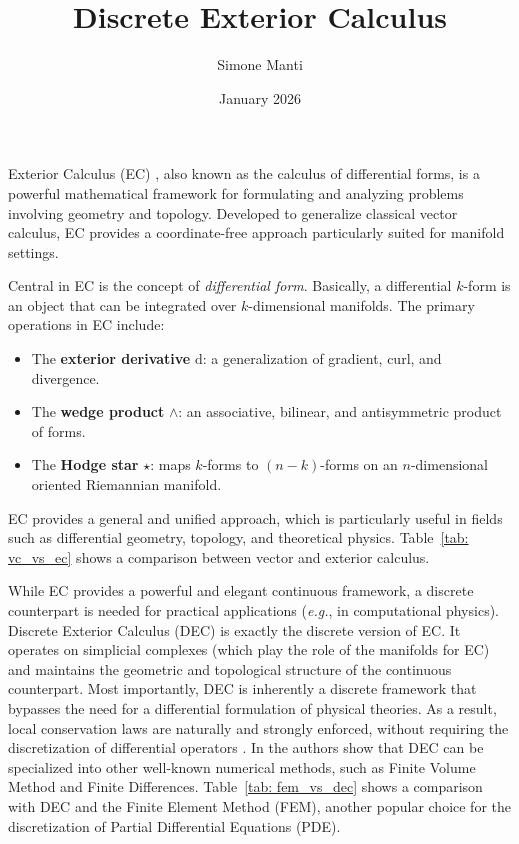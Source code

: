 \documentclass{article}
\title{Discrete Exterior Calculus}
\author{Simone Manti}
\date{January 2026}
\theoremstyle{definition} %
\theoremstyle{plain} %
\theoremstyle{remark} %
\begin{document}
\maketitle

Exterior Calculus (EC) \cite{abraham2012manifolds}, also known as the calculus of differential forms, is a powerful mathematical framework for formulating and analyzing problems involving geometry and topology. Developed to generalize classical vector calculus, EC provides a coordinate-free approach particularly suited for manifold settings.

Central in EC is the concept of \textit{differential form}. Basically, a differential $k$-form is an object that can be integrated over $k$-dimensional manifolds. The primary operations in EC include:
\begin{itemize}
\item The \textbf{exterior derivative} $\mathrm{d}$: a generalization of gradient, curl, and divergence.
\item The \textbf{wedge product} $\wedge$: an associative, bilinear, and antisymmetric product of forms.
\item The \textbf{Hodge star} $\star$: maps $k$-forms to $(n-k)$-forms on an $n$-dimensional oriented Riemannian manifold.
\end{itemize}
EC provides a general and unified approach, which is particularly useful in fields such as differential geometry, topology, and theoretical physics. Table~\ref{tab: vc_vs_ec} shows a comparison between vector and exterior calculus.

While EC provides a powerful and elegant continuous framework, a discrete counterpart is needed for practical applications (\textsl{e.g.}, in computational physics).
Discrete Exterior Calculus (DEC) \cite{hirani2003discrete, desbrun2005discrete} is exactly the discrete version of EC. It operates on simplicial complexes (which play the role of the manifolds for EC) and maintains the geometric and topological structure of the continuous counterpart. 
Most importantly, DEC is inherently a discrete framework that bypasses the need for a differential formulation of physical theories. As a result, local conservation laws are naturally and strongly enforced, without requiring the discretization of differential operators \cite{tonti2013mathematical}.
In \cite{griebel2017upwind} the authors show that DEC can be specialized into other well-known numerical methods, such as Finite Volume Method and Finite Differences. Table~\ref{tab: fem_vs_dec} shows a comparison with DEC and the Finite Element Method (FEM), another popular choice for the discretization of Partial Differential Equations (PDE).
\end{document}
